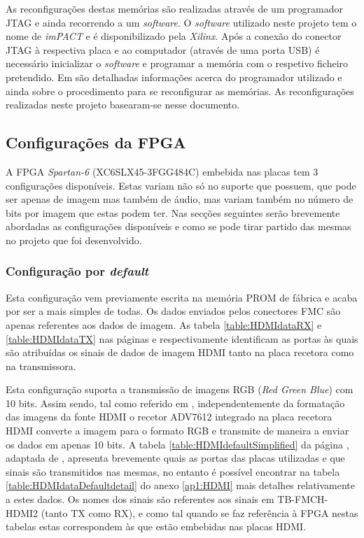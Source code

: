 As reconfigurações destas memórias são realizadas através de um programador JTAG e ainda recorrendo a um \textit{software}. O \textit{software} utilizado neste projeto tem o nome de \textit{imPACT} e é disponibilizado pela \textit{Xilinx}. Após a conexão do conector JTAG à respectiva placa e ao computador (através de uma porta USB) é necessário inicializar o \textit{software} e programar a memória com o respetivo ficheiro pretendido. Em \cite{R025} são detalhadas informações acerca do programador utilizado e ainda sobre o procedimento para se reconfigurar as memórias. As reconfigurações realizadas neste projeto basearam-se nesse documento.

\subsection{Configurações da FPGA} \label{subsec:HDMIconfig}

A FPGA \textit{Spartan-6} (XC6SLX45-3FGG484C) embebida nas placas tem 3 configurações disponíveis. Estas variam não só no suporte que possuem, que pode ser apenas de imagem mas também de áudio, mas variam também no número de bits por imagem que estas podem ter. Nas secções seguintes serão brevemente abordadas as configurações disponíveis e como se pode tirar partido das mesmas no projeto que foi desenvolvido.

\subsubsection{Configuração por \textit{default}} \label{subsubsec:HDMIconfigdefault}

Esta configuração vem previamente escrita na memória PROM de fábrica e acaba por ser a mais simples de todas. Os dados enviados pelos conectores FMC são apenas referentes aos dados de imagem. As tabela \ref{table:HDMIdataRX} e \ref{table:HDMIdataTX} nas páginas \pageref{table:HDMIdataRX} e \pageref{table:HDMIdataTX} respectivamente identificam as portas às quais são atribuídas os sinais de dados de imagem HDMI tanto na placa recetora como na transmissora.

Esta configuração suporta a transmissão de imagens RGB (\textit{Red Green Blue}) com 10 bits. Assim sendo, tal como referido em \cite{R009}, independentemente da formatação das imagens da fonte HDMI o recetor ADV7612 integrado na placa recetora HDMI converte a imagem para o formato RGB e transmite de maneira a enviar os dados em apenas 10 bits. A tabela \ref{table:HDMIdefaultSimplified} da página \pageref{table:HDMIdefaultSimplified}, adaptada de \cite{R009}, apresenta brevemente quais as portas das placas utilizadas e que sinais são transmitidos nas mesmas, no entanto é possível encontrar na tabela \ref{table:HDMIdataDefaultdetail} do anexo \ref{ap1:HDMI} mais detalhes relativamente a estes dados. Os nomes dos sinais são referentes aos sinais em TB-FMCH-HDMI2 (tanto TX como RX), e como tal quando se faz referência à FPGA nestas tabelas estas correspondem às que estão embebidas nas placas HDMI. 

